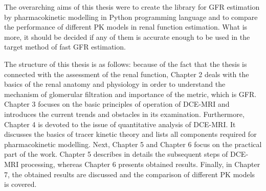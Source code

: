 The overarching aims of this thesis were to create the library for GFR estimation by pharmacokinetic modelling in Python programming language and to compare the performance of different PK models in renal function estimation. What is more, it should be decided if any of them is accurate enough to be used in the target method of fast GFR estimation. 

The structure of this thesis is as follows:
because of the fact that the thesis is connected with the assessment of the renal function, Chapter 2 deals with the basics of the renal anatomy and physiology in order to understand the mechanism of glomerular filtration and importance of the metric, which is GFR.
Chapter 3 focuses on the basic principles of operation of DCE-MRI and introduces the current trends and obstacles in its examination.  
Furthermore, Chapter 4 is devoted to the issue of quantitative analysis of DCE-MRI. 
It discusses the  basics of tracer kinetic theory and lists all components required for pharmacokinetic modelling.  
Next, Chapter 5 and Chapter 6 focus on the practical part of the work.  
Chapter 5 describes in details the subsequent steps of DCE-MRI processing, whereas Chapter 6 presents obtained results. 
Finally, in Chapter 7, the obtained results are discussed and the comparison of different PK models is covered. 



